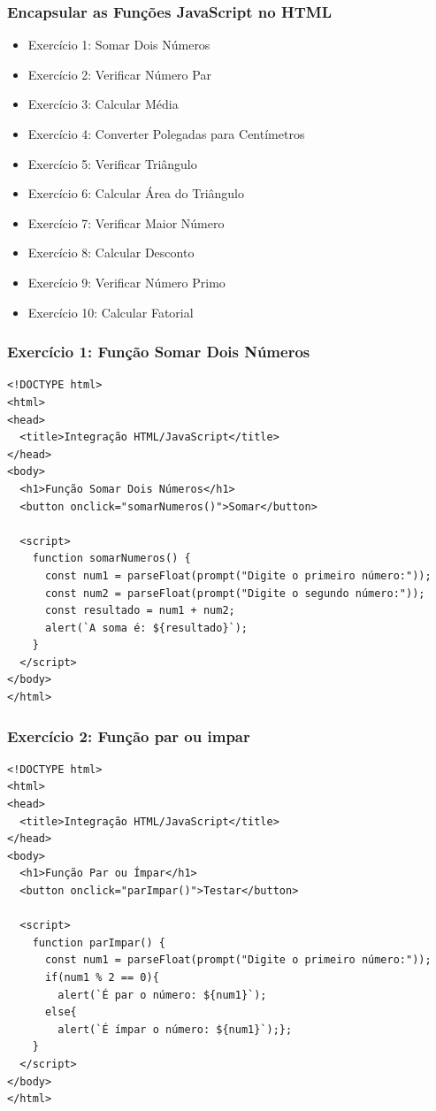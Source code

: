 \documentclass[13pt, xcolor={dvipsnames,svgnames}, portuguese]{beamer}
\begin{document}
\begin{frame}[fragile]
\frametitle{Encapsular as Funções JavaScript no HTML}

\begin{itemize}
  \item Exercício 1: Somar Dois Números
  \item Exercício 2: Verificar Número Par
  \item Exercício 3: Calcular Média
  \item Exercício 4: Converter Polegadas para Centímetros
  \item Exercício 5: Verificar Triângulo
  \item Exercício 6: Calcular Área do Triângulo
  \item Exercício 7: Verificar Maior Número
  \item Exercício 8: Calcular Desconto
  \item Exercício 9: Verificar Número Primo
  \item Exercício 10: Calcular Fatorial
\end{itemize}

\end{frame}
\begin{frame}[fragile]
\frametitle{Exercício 1: Função Somar Dois Números}

\begin{verbatim}
<!DOCTYPE html>
<html>
<head>
  <title>Integração HTML/JavaScript</title>
</head>
<body>
  <h1>Função Somar Dois Números</h1>
  <button onclick="somarNumeros()">Somar</button>

  <script>
    function somarNumeros() {
      const num1 = parseFloat(prompt("Digite o primeiro número:"));
      const num2 = parseFloat(prompt("Digite o segundo número:"));
      const resultado = num1 + num2;
      alert(`A soma é: ${resultado}`);
    }
  </script>
</body>
</html>
\end{verbatim}

\end{frame}

\begin{frame}[fragile]
\frametitle{Exercício 2: Função par ou impar}

\begin{verbatim}
<!DOCTYPE html>
<html>
<head>
  <title>Integração HTML/JavaScript</title>
</head>
<body>
  <h1>Função Par ou Ímpar</h1>
  <button onclick="parImpar()">Testar</button>

  <script>
    function parImpar() {
      const num1 = parseFloat(prompt("Digite o primeiro número:"));
	  if(num1 % 2 == 0){
      	alert(`É par o número: ${num1}`);
      else{
      	alert(`É ímpar o número: ${num1}`);};
    }
  </script>
</body>
</html>
\end{verbatim}

\end{frame}
\end{document}
